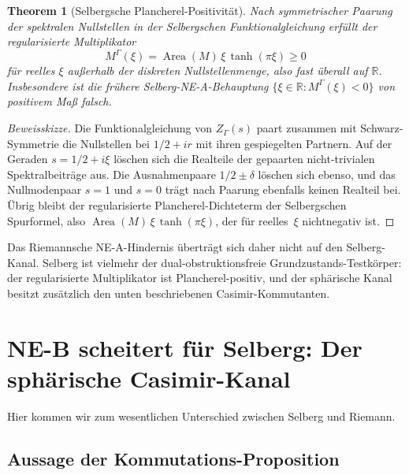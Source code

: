 \documentclass[12pt,a4paper]{article}
\newtheorem{theorem}{Theorem}[section]
\theoremstyle{definition}
\theoremstyle{remark}
\newcommand{\RR}{\mathbb{R}}
\newcommand{\Sel}{Z_{\Gamma}}
\begin{document}
\begin{theorem}[Selbergsche Plancherel-Positivität]
\label{thm:plancherel-positivity}
Nach symmetrischer Paarung der spektralen Nullstellen in der Selbergschen
Funktionalgleichung erfüllt der regularisierte Multiplikator
\begin{equation}
\label{eq:plancherel-positivity}
M^\Gamma(\xi)=\operatorname{Area}(M)\,\xi\,\tanh(\pi\xi)\ge 0
\end{equation}
für reelles $\xi$ außerhalb der diskreten Nullstellenmenge, also fast überall
auf $\RR$. Insbesondere ist die frühere Selberg-NE-A-Behauptung
$\{\xi\in\RR:M^\Gamma(\xi)<0\}$ von positivem Maß falsch.
\end{theorem}

\begin{proof}[Beweisskizze]
Die Funktionalgleichung von $\Sel(s)$ paart zusammen mit Schwarz-Symmetrie die
Nullstellen bei $1/2+i r$ mit ihren gespiegelten Partnern. Auf der Geraden
$s=1/2+i\xi$ löschen sich die Realteile der gepaarten nicht-trivialen
Spektralbeiträge aus. Die Ausnahmenpaare $1/2\pm\delta$ löschen sich ebenso,
und das Nullmodenpaar $s=1$ und $s=0$ trägt nach Paarung ebenfalls keinen
Realteil bei. Übrig bleibt der regularisierte Plancherel-Dichteterm der
Selbergschen Spurformel, also $\operatorname{Area}(M)\,\xi\,\tanh(\pi\xi)$,
der für reelles~$\xi$ nichtnegativ ist.
\end{proof}

Das Riemannsche NE-A-Hindernis überträgt sich daher nicht auf den Selberg-Kanal.
Selberg ist vielmehr der dual-obstruktionsfreie Grundzustands-Testkörper: der
regularisierte Multiplikator ist Plancherel-positiv, und der sphärische Kanal
besitzt zusätzlich den unten beschriebenen Casimir-Kommutanten.

\section[NE-B scheitert für Selberg: Der sphärische Casimir-Kanal]{NE-B scheitert für Selberg: Der sphärische Casimir-Kanal}
\label{sec:ne-b-fails}

Hier kommen wir zum wesentlichen Unterschied zwischen Selberg und Riemann.

\subsection{Aussage der Kommutations-Proposition}
\end{document}
